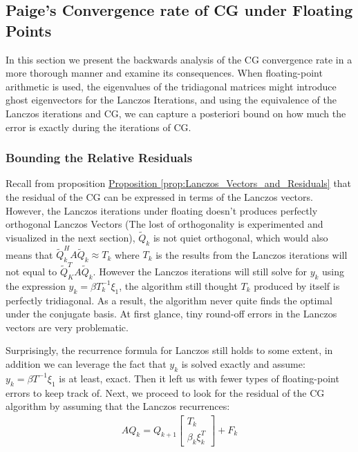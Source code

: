 \documentclass[]{article}
\theoremstyle{definition}
\begin{document}
    \subsection{Paige's Convergence rate of CG under Floating Points}
        In this section we present the backwards analysis of the CG convergence rate in a more thorough manner and examine its consequences. When floating-point arithmetic is used, the eigenvalues of the tridiagonal matrices might introduce ghost eigenvectors for the Lanczos Iterations, and using the equivalence of the Lanczos iterations and CG, we can capture a posteriori bound on how much the error is exactly during the iterations of CG. 
        \subsubsection{Bounding the Relative Residuals}
            Recall from proposition \hyperref[prop:Lanczos_Vectors_and_Residuals]{Proposition \ref*{prop:Lanczos_Vectors_and_Residuals}} that the residual of the CG can be expressed in terms of the Lanczos vectors. However, the Lanczos iterations under floating doesn't produces perfectly orthogonal Lanczos Vectors (The lost of orthogonality is experimented and visualized in the next section), $\tilde{Q}_k$ is not quiet orthogonal, which would also means that $\tilde{Q}_k^HA\tilde{Q}_k\approx T_k$ where $T_k$ is the results from the Lanczos iterations will not equal to $\tilde{Q}^T_KA\tilde{Q}_k$. However the Lanczos iterations will still solve for $y_k$ using the expression $y_k = \beta T^{-1}_k\xi_1$, the algorithm still thought $T_k$ produced by itself is perfectly tridiagonal. As a result, the algorithm never quite finds the optimal under the conjugate basis. At first glance, tiny round-off errors in the Lanczos vectors are very problematic. 
            \par
            Surprisingly, the recurrence formula for Lanczos still holds to some extent, in addition we can leverage the fact that $y_k$ is solved exactly and assume: $y_k = \beta T^{-1}\xi_1$ is at least, exact. Then it left us with fewer types of floating-point errors to keep track of. Next, we proceed to look for the residual of the CG algorithm by assuming that the Lanczos recurrences: 
            \begin{align}
                AQ_k = Q_{k + 1} \begin{bmatrix}
                    T_k
                    \\
                    \beta_k \xi_k^T
                \end{bmatrix} + F_k
            \end{align}
\end{document}
